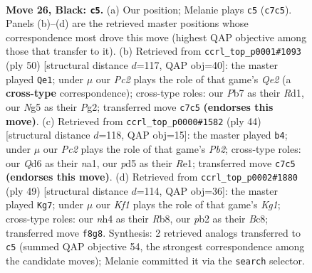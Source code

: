 \documentclass[11pt]{article}
\begin{document}
\clearpage

\begin{figure}[p]\centering
\begin{subfigure}{0.46\textwidth}\centering
\resizebox{\linewidth}{!}{%
\newchessgame
\chessboard[
  setfen={r1bn1k2/1ppp1pp1/p2q4/3Pr1np/QB5N/4P1P1/PP2RPBP/1R4K1 b - - 1 26},
  showmover=false,
  pgfstyle=straightmove, color=movearrow, markmove={c7-c5}
]}
\caption{}
\end{subfigure}\hfill
\begin{subfigure}{0.46\textwidth}\centering
\resizebox{\linewidth}{!}{%
\newchessgame
\chessboard[
  setfen={1rr3k1/5pp1/ppbp1b1p/4pP1R/1PPqP3/P1NB4/4Q1PP/3R3K w - - 1 26},
  showmover=false,
  pgfstyle=straightmove, color=movearrow, markmove={e2-e1}
]}
\caption{}
\end{subfigure}
\\[4pt]
\begin{subfigure}{0.46\textwidth}\centering
\resizebox{\linewidth}{!}{%
\newchessgame
\chessboard[
  setfen={r1r1bn1k/1p3pp1/pq2p2p/2bpP3/P4B1P/2P2NP1/RP3PB1/n2QR1K1 w - - 0 23},
  showmover=false,
  pgfstyle=straightmove, color=movearrow, markmove={b2-b4}
]}
\caption{}
\end{subfigure}\hfill
\begin{subfigure}{0.46\textwidth}\centering
\resizebox{\linewidth}{!}{%
\newchessgame
\chessboard[
  setfen={1rb2rk1/5p2/p1pq1np1/Q1Npp2p/4P3/R2B1PP1/PPP4P/1K1R4 b - - 3 25},
  showmover=false,
  pgfstyle=straightmove, color=movearrow, markmove={g8-g7}
]}
\caption{}
\end{subfigure}
\caption{\textbf{Move 26, Black: \texttt{c5}.} (a) Our position; Melanie plays \texttt{c5} (\texttt{c7c5}). Panels (b)--(d) are the retrieved master positions whose correspondence most drove this move (highest QAP objective among those that transfer to it). (b) Retrieved from \texttt{ccrl\_top\_p0001\#1093} (ply 50) [structural distance $d$=117, QAP obj=40]: the master played \texttt{Qe1}; under $\mu$ our \emph{Pc2} plays the role of that game's \emph{Qe2} (a \textbf{cross-type} correspondence); cross-type roles: our \emph{P}b7 as their \emph{R}d1, our \emph{N}g5 as their \emph{P}g2; transferred move \texttt{c7c5} \textbf{(endorses this move)}. (c) Retrieved from \texttt{ccrl\_top\_p0000\#1582} (ply 44) [structural distance $d$=118, QAP obj=15]: the master played \texttt{b4}; under $\mu$ our \emph{Pc2} plays the role of that game's \emph{Pb2}; cross-type roles: our \emph{Q}d6 as their \emph{n}a1, our \emph{p}d5 as their \emph{R}e1; transferred move \texttt{c7c5} \textbf{(endorses this move)}. (d) Retrieved from \texttt{ccrl\_top\_p0002\#1880} (ply 49) [structural distance $d$=114, QAP obj=36]: the master played \texttt{Kg7}; under $\mu$ our \emph{Kf1} plays the role of that game's \emph{Kg1}; cross-type roles: our \emph{n}h4 as their \emph{R}b8, our \emph{p}b2 as their \emph{B}c8; transferred move \texttt{f8g8}. Synthesis: 2 retrieved analogs transferred to \texttt{c5} (summed QAP objective 54, the strongest correspondence among the candidate moves); Melanie committed it via the \texttt{search} selector.}
\label{fig:thought-m51}
\end{figure}
\end{document}
